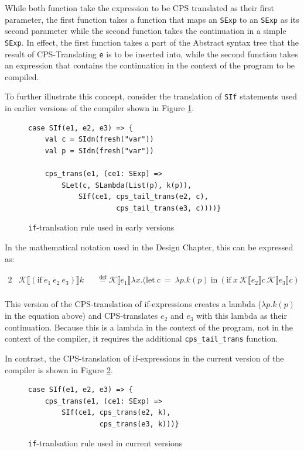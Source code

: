 \documentclass[11pt]{report}
\newcommand{\eqdef}{\stackrel{\text{def}}{=}}%
\newcommand{\cpstrans}[1]{\ensuremath{\mathcal{K}\llbracket #1 \rrbracket}}
\begin{document}
While both function take the expression to be CPS translated as their first parameter, the first function takes a function that maps an \texttt{SExp} to an \texttt{SExp} as its second parameter while the second function takes the continuation in a simple \texttt{SExp}. In effect, the first function takes a part of the Abstract syntax tree that the result of CPS-Translating \texttt{e} is to be inserted into, while the second function takes an expression that contains the continuation in the context of the program to be compiled.

To further illustrate this concept, consider the translation of \texttt{SIf} statements used in earlier versions of the compiler shown in Figure \ref{ifcpstrans}.

\begin{figure}[ht]
\begin{lstlisting}
case SIf(e1, e2, e3) => {
    val c = SIdn(fresh("var"))
    val p = SIdn(fresh("var"))
    
    cps_trans(e1, (ce1: SExp) =>
        SLet(c, SLambda(List(p), k(p)),
            SIf(ce1, cps_tail_trans(e2, c), 
                     cps_tail_trans(e3, c))))}
\end{lstlisting}
\caption{\texttt{if}-tranlsation rule used in early versions}
\label{ifcpstrans}
\end{figure}

In the mathematical notation used in the Design Chapter, this can be expressed as:

\begin{alignat*}{2}
&\cpstrans{(\text{if}\ e_1\ e_2\ e_3)} k &&\eqdef \cpstrans{e_1} \lambda x.(\text{let}~c~=~\lambda p.k(p)~\text{in}~(\text{if}\ x\ \cpstrans{e_2}c\ \cpstrans{e_3}c) \\
\end{alignat*}

This version of the CPS-translation of if-expressions creates a lambda ($\lambda p.k(p)$ in the equation above) and CPS-translates $e_2$ and $e_3$ with this lambda as their continuation. Because this is a lambda in the context of the program, not in the context of the compiler, it requires the additional \texttt{cps_tail_trans} function.

In contrast, the CPS-translation of if-expressions in the current version of the compiler is shown in Figure \ref{ifcpstranscurrent}.

\begin{figure}[ht]
\begin{lstlisting}
case SIf(e1, e2, e3) => {
    cps_trans(e1, (ce1: SExp) => 
        SIf(ce1, cps_trans(e2, k), 
                 cps_trans(e3, k)))}
\end{lstlisting}
\caption{\texttt{if}-tranlsation rule used in current versions}
\label{ifcpstranscurrent}
\end{figure}
\end{document}
